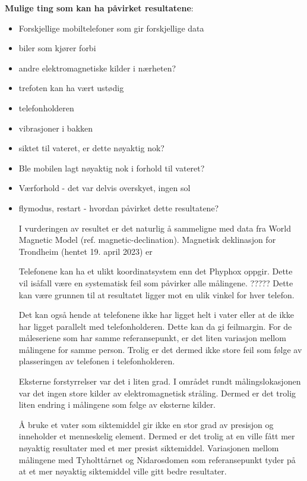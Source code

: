 \noindent\textbf{Mulige ting som kan ha påvirket resultatene}:
\begin{itemize}
    \item Forskjellige mobiltelefoner som gir forskjellige data 
    \item biler som kjører forbi
    \item andre elektromagnetiske kilder i nærheten? 
    \item trefoten kan ha vært ustødig
    \item telefonholderen
    \item vibrasjoner i bakken               
    \item siktet til vateret, er dette nøyaktig nok?
    \item Ble mobilen lagt nøyaktig nok i forhold til vateret?
    \item Værforhold - det var delvis overskyet, ingen sol
    \item flymodus, restart - hvordan påvirket dette resultatene?

I vurderingen av resultet er det naturlig å sammeligne med data fra World Magnetic Model (ref. magnetic-declination). 
Magnetisk deklinasjon for Trondheim (hentet 19. april 2023) er  

Telefonene kan ha et ulikt koordinatsystem enn det Phyphox oppgir. 
Dette vil isåfall være en systematisk feil som påvirker alle målingene. 
????? Dette kan være grunnen til at resultatet ligger  mot en ulik vinkel for hver telefon. 

Det kan også hende at telefonene ikke har ligget helt i vater eller at de ikke har ligget parallelt med telefonholderen. Dette kan da gi feilmargin. For de måleseriene som har samme referansepunkt, er det liten variasjon mellom målingene for samme person. Trolig er det dermed ikke store feil som følge av plasseringen av telefonen i telefonholderen. 

Eksterne forstyrrelser var det i liten grad. I området rundt målingslokasjonen var det ingen store kilder av elektromagnetisk stråling. Dermed er det trolig liten endring i målingene som følge av eksterne kilder. 

Å bruke et vater som siktemiddel gir ikke en stor grad av presisjon og inneholder et menneskelig element. Dermed er det trolig at en ville fått mer nøyaktig resultater med et mer presist siktemiddel. Variasjonen mellom målingene med Tyholttårnet og Nidarosdomen som referansepunkt tyder på at et mer nøyaktig siktemiddel ville gitt bedre resultater.

\end{itemize}



 